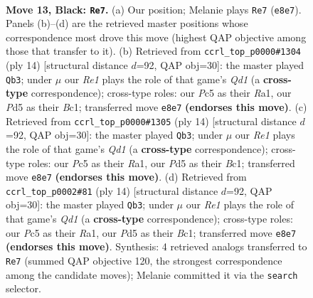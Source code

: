 \documentclass[11pt]{article}
\begin{document}
\clearpage

\begin{figure}[p]\centering
\begin{subfigure}{0.46\textwidth}\centering
\resizebox{\linewidth}{!}{%
\newchessgame
\chessboard[
  setfen={r1bqr1k1/p4ppp/1n2pn2/2pp4/8/2PBP1P1/PP3RPP/RNQ1N1K1 b - - 5 13},
  showmover=false,
  pgfstyle=straightmove, color=movearrow, markmove={e8-e7}
]}
\caption{}
\end{subfigure}\hfill
\begin{subfigure}{0.46\textwidth}\centering
\resizebox{\linewidth}{!}{%
\newchessgame
\chessboard[
  setfen={rn1qk2r/ppp1ppbp/6p1/3nPb2/3P4/2P2N2/PP4PP/RNBQKB1R w KQkq - 3 8},
  showmover=false,
  pgfstyle=straightmove, color=movearrow, markmove={d1-b3}
]}
\caption{}
\end{subfigure}
\\[4pt]
\begin{subfigure}{0.46\textwidth}\centering
\resizebox{\linewidth}{!}{%
\newchessgame
\chessboard[
  setfen={rn1qk2r/ppp1ppbp/6p1/3nPb2/3P4/2P2N2/PP4PP/RNBQKB1R w KQkq - 3 8},
  showmover=false,
  pgfstyle=straightmove, color=movearrow, markmove={d1-b3}
]}
\caption{}
\end{subfigure}\hfill
\begin{subfigure}{0.46\textwidth}\centering
\resizebox{\linewidth}{!}{%
\newchessgame
\chessboard[
  setfen={rn1qk2r/ppp1ppbp/6p1/3nPb2/3P4/2P2N2/PP4PP/RNBQKB1R w KQkq - 3 8},
  showmover=false,
  pgfstyle=straightmove, color=movearrow, markmove={d1-b3}
]}
\caption{}
\end{subfigure}
\caption{\textbf{Move 13, Black: \texttt{Re7}.} (a) Our position; Melanie plays \texttt{Re7} (\texttt{e8e7}). Panels (b)--(d) are the retrieved master positions whose correspondence most drove this move (highest QAP objective among those that transfer to it). (b) Retrieved from \texttt{ccrl\_top\_p0000\#1304} (ply 14) [structural distance $d$=92, QAP obj=30]: the master played \texttt{Qb3}; under $\mu$ our \emph{Re1} plays the role of that game's \emph{Qd1} (a \textbf{cross-type} correspondence); cross-type roles: our \emph{P}c5 as their \emph{R}a1, our \emph{P}d5 as their \emph{B}c1; transferred move \texttt{e8e7} \textbf{(endorses this move)}. (c) Retrieved from \texttt{ccrl\_top\_p0000\#1305} (ply 14) [structural distance $d$=92, QAP obj=30]: the master played \texttt{Qb3}; under $\mu$ our \emph{Re1} plays the role of that game's \emph{Qd1} (a \textbf{cross-type} correspondence); cross-type roles: our \emph{P}c5 as their \emph{R}a1, our \emph{P}d5 as their \emph{B}c1; transferred move \texttt{e8e7} \textbf{(endorses this move)}. (d) Retrieved from \texttt{ccrl\_top\_p0002\#81} (ply 14) [structural distance $d$=92, QAP obj=30]: the master played \texttt{Qb3}; under $\mu$ our \emph{Re1} plays the role of that game's \emph{Qd1} (a \textbf{cross-type} correspondence); cross-type roles: our \emph{P}c5 as their \emph{R}a1, our \emph{P}d5 as their \emph{B}c1; transferred move \texttt{e8e7} \textbf{(endorses this move)}. Synthesis: 4 retrieved analogs transferred to \texttt{Re7} (summed QAP objective 120, the strongest correspondence among the candidate moves); Melanie committed it via the \texttt{search} selector.}
\label{fig:thought-m25}
\end{figure}
\end{document}
